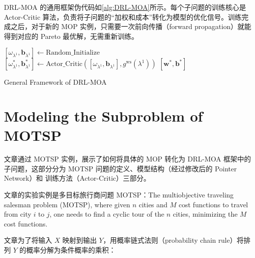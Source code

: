 \documentclass[fontset=none]{ctexart}
\begin{document}
DRL-MOA 的通用框架伪代码如\cref{alg:DRL-MOA}所示。每个子问题的训练核心是 Actor-Critic 算法，负责将子问题的“加权和成本”转化为模型的优化信号。训练完成之后，对于新的 MOP 实例，只需要一次前向传播（forward propagation）就能得到对应的 Pareto 最优解，无需重新训练。

\begin{algorithm}[H]
    \SetAlgoLined
    \SetNoFillComment
    \vspace{3mm}
    $[\omega_{\lambda^1}, \mathbf{b}_{\lambda^1}] \leftarrow \text{Random\_Initialize}$\;
     {
         {
            $[\omega_{\lambda^1}^*, \mathbf{b}_{\lambda^1}^*] \leftarrow \text{Actor\_Critic}([\omega_{\lambda^1}, \mathbf{b}_{\lambda^1}], g^{\text{ws}}(\lambda^1))$\;
        }
    }
    \Return $[\mathbf{w}^*, \mathbf{b}^*]$\;
    \caption{General Framework of DRL-MOA}
    \label{alg:DRL-MOA}
\end{algorithm}

\section{Modeling the Subproblem of MOTSP}

文章通过 MOTSP 实例，展示了如何将具体的 MOP 转化为 DRL-MOA 框架中的子问题，这部分分为 MOTSP 问题的定义、模型结构（经过修改后的 Pointer Network\cite{nazariReinforcementLearningSolving2018}）和 训练方法（Actor-Critic\cite{nazariReinforcementLearningSolving2018,belloNeuralCombinatorialOptimization2017}）三部分。

文章的实验实例是多目标旅行商问题 MOTSP：The multiobjective traveling salesman problem (MOTSP), where given $n$ cities and $M$ cost functions to travel from city $i$ to $j$, one needs to find a cyclic tour of the $n$ cities, minimizing the $M$ cost functions. 

文章为了将输入 $X$ 映射到输出 $Y$，用概率链式法则（probability chain rule）将排列 $Y$ 的概率分解为条件概率的乘积：
\end{document}
